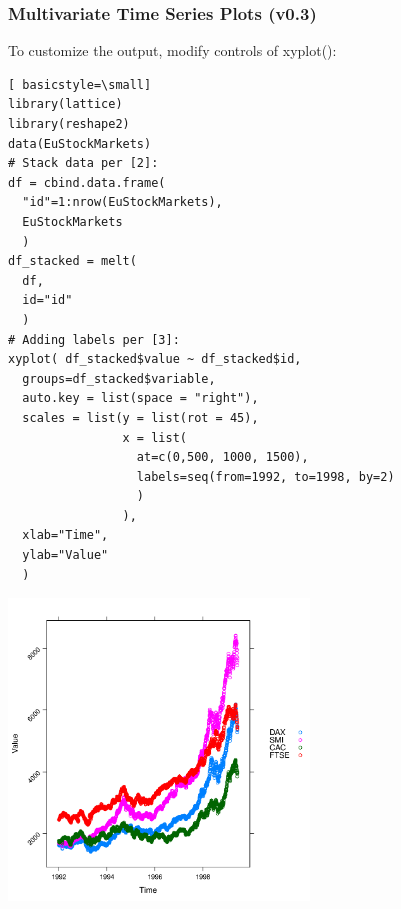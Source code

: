 \begin{frame}
 \frametitle{Multivariate Time Series Plots (v0.3)}

To customize the output, modify controls of \ttfamily xyplot()\normalfont :

    \begin{lstlisting}[ basicstyle=\small]
library(lattice)
library(reshape2)   
data(EuStockMarkets)
# Stack data per [2]:
df = cbind.data.frame(
  "id"=1:nrow(EuStockMarkets),
  EuStockMarkets
  )
df_stacked = melt(
  df,
  id="id"
  )
# Adding labels per [3]:
xyplot( df_stacked$value ~ df_stacked$id, 
  groups=df_stacked$variable,
  auto.key = list(space = "right"),
  scales = list(y = list(rot = 45),
                x = list(
                  at=c(0,500, 1000, 1500),
                  labels=seq(from=1992, to=1998, by=2)
                  )
                ),
  xlab="Time",
  ylab="Value"
  )
    \end{lstlisting}
       \begin{center}
         \includegraphics[width=0.6\textwidth]{images/stockPlot1.pdf}
        \end{center}
\end{frame}

